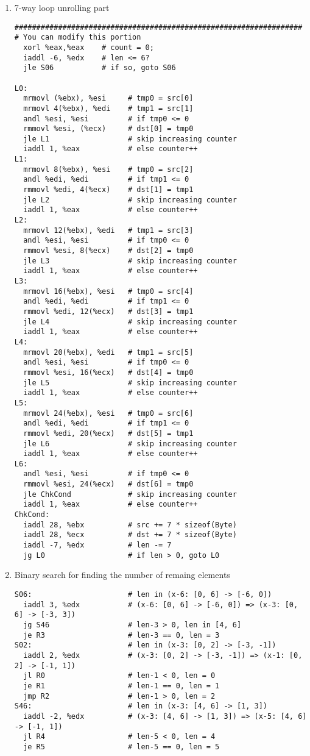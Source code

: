 \documentclass{article}
\begin{document}
\begin{enumerate}
  \item 7-way loop unrolling part
\begin{lstlisting}
##################################################################
# You can modify this portion
  xorl %eax,%eax    # count = 0;
  iaddl -6, %edx    # len <= 6?
  jle S06           # if so, goto S06

L0:
  mrmovl (%ebx), %esi     # tmp0 = src[0]
  mrmovl 4(%ebx), %edi    # tmp1 = src[1]
  andl %esi, %esi         # if tmp0 <= 0
  rmmovl %esi, (%ecx)     # dst[0] = tmp0
  jle L1                  # skip increasing counter
  iaddl 1, %eax           # else counter++
L1:
  mrmovl 8(%ebx), %esi    # tmp0 = src[2]
  andl %edi, %edi         # if tmp1 <= 0
  rmmovl %edi, 4(%ecx)    # dst[1] = tmp1
  jle L2                  # skip increasing counter
  iaddl 1, %eax           # else counter++
L2:
  mrmovl 12(%ebx), %edi   # tmp1 = src[3]
  andl %esi, %esi         # if tmp0 <= 0
  rmmovl %esi, 8(%ecx)    # dst[2] = tmp0
  jle L3                  # skip increasing counter
  iaddl 1, %eax           # else counter++
L3:
  mrmovl 16(%ebx), %esi   # tmp0 = src[4]
  andl %edi, %edi         # if tmp1 <= 0
  rmmovl %edi, 12(%ecx)   # dst[3] = tmp1
  jle L4                  # skip increasing counter
  iaddl 1, %eax           # else counter++
L4:
  mrmovl 20(%ebx), %edi   # tmp1 = src[5]
  andl %esi, %esi         # if tmp0 <= 0
  rmmovl %esi, 16(%ecx)   # dst[4] = tmp0
  jle L5                  # skip increasing counter
  iaddl 1, %eax           # else counter++
L5:
  mrmovl 24(%ebx), %esi   # tmp0 = src[6]
  andl %edi, %edi         # if tmp1 <= 0
  rmmovl %edi, 20(%ecx)   # dst[5] = tmp1
  jle L6                  # skip increasing counter
  iaddl 1, %eax           # else counter++
L6:
  andl %esi, %esi         # if tmp0 <= 0
  rmmovl %esi, 24(%ecx)   # dst[6] = tmp0
  jle ChkCond             # skip increasing counter
  iaddl 1, %eax           # else counter++
ChkCond:
  iaddl 28, %ebx          # src += 7 * sizeof(Byte)
  iaddl 28, %ecx          # dst += 7 * sizeof(Byte)
  iaddl -7, %edx          # len -= 7
  jg L0                   # if len > 0, goto L0
\end{lstlisting}

  \item	Binary search for finding the number of remaing elements
\begin{lstlisting}
S06:                      # len in (x-6: [0, 6] -> [-6, 0])
  iaddl 3, %edx           # (x-6: [0, 6] -> [-6, 0]) => (x-3: [0, 6] -> [-3, 3])
  jg S46                  # len-3 > 0, len in [4, 6]
  je R3                   # len-3 == 0, len = 3
S02:                      # len in (x-3: [0, 2] -> [-3, -1])
  iaddl 2, %edx           # (x-3: [0, 2] -> [-3, -1]) => (x-1: [0, 2] -> [-1, 1])
  jl R0                   # len-1 < 0, len = 0
  je R1                   # len-1 == 0, len = 1
  jmp R2                  # len-1 > 0, len = 2
S46:                      # len in (x-3: [4, 6] -> [1, 3])
  iaddl -2, %edx          # (x-3: [4, 6] -> [1, 3]) => (x-5: [4, 6] -> [-1, 1])
  jl R4                   # len-5 < 0, len = 4
  je R5                   # len-5 == 0, len = 5
\end{lstlisting}


\end{enumerate}
\end{document}

